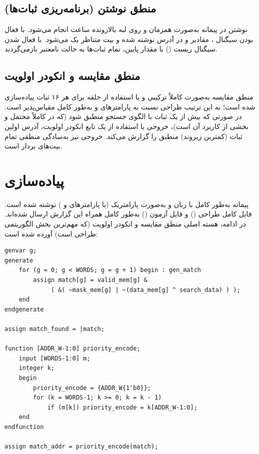 \documentclass[11pt,a4paper]{article}
\begin{document}
\subsection{منطق نوشتن (برنامه‌ریزی ثبات‌ها)}
نوشتن در پیمانه به‌صورت همزمان  و روی لبه بالارونده
ساعت انجام می‌شود. با فعال بودن سیگنال ، مقادیر
 و  در آدرس 
نوشته شده و بیت  متناظر یک می‌شود. با فعال شدن سیگنال
ریست () با مقدار پایین، تمام ثبات‌ها به حالت نامعتبر
بازمی‌گردند.

\subsection{منطق مقایسه و انکودر اولویت}
منطق مقایسه به‌صورت کاملاً ترکیبی  و با استفاده از
حلقه  برای هر ۱۶ ثبات پیاده‌سازی شده است؛ به این
ترتیب طراحی نسبت به پارامترهای  و 
به‌طور کامل مقیاس‌پذیر است. در صورتی که بیش از یک ثبات با الگوی جستجو
منطبق شود (که در  کاملاً محتمل و بخشی از کاربرد آن است)، خروجی
 با استفاده از یک تابع انکودر اولویت، آدرس اولین
ثبات (کمترین زیروند) منطبق را گزارش می‌کند. خروجی 
نیز به‌سادگی  منطقی تمام بیت‌های بردار  است.

\section{پیاده‌سازی }
پیمانه به‌طور کامل با زبان  و به‌صورت پارامتریک (با پارامترهای
 و ) نوشته شده است. فایل کامل 
 طراحی () و فایل آزمون
() به‌طور کامل همراه این گزارش ارسال شده‌اند. در
ادامه، هسته اصلی منطق مقایسه و انکودر اولویت  (که مهم‌ترین بخش الگوریتمی
طراحی است)  آورده شده است:

\begin{latin}
\begin{lstlisting}[caption={Core match logic and priority encoder (excerpt from tcam.v)}]
genvar g;
generate
    for (g = 0; g < WORDS; g = g + 1) begin : gen_match
        assign match[g] = valid_mem[g] &
             ( &( ~mask_mem[g] | ~(data_mem[g] ^ search_data) ) );
    end
endgenerate

assign match_found = |match;

function [ADDR_W-1:0] priority_encode;
    input [WORDS-1:0] m;
    integer k;
    begin
        priority_encode = {ADDR_W{1'b0}};
        for (k = WORDS-1; k >= 0; k = k - 1)
            if (m[k]) priority_encode = k[ADDR_W-1:0];
    end
endfunction

assign match_addr = priority_encode(match);
\end{lstlisting}
\end{latin}
\end{document}
